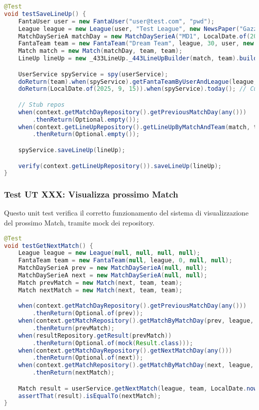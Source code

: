 \begin{lstlisting}[language=Java]
@Test
void testSaveLineUp() {
	FantaUser user = new FantaUser("user@test.com", "pwd");
	League league = new League(user, "Test League", new NewsPaper("Gazzetta"), "L003");
	MatchDaySerieA matchDay = new MatchDaySerieA("MD1", LocalDate.of(2025, 9, 15)); // Monday
	FantaTeam team = new FantaTeam("Dream Team", league, 30, user, new HashSet<>());
	Match match = new Match(matchDay, team, team);
	LineUp lineUp = new _433LineUp._443LineUpBuilder(match, team).build();

	UserService spyService = spy(userService);
	doReturn(team).when(spyService).getFantaTeamByUserAndLeague(league, user);
	doReturn(LocalDate.of(2025, 9, 15)).when(spyService).today(); // Current Monday

	// Stub repos
	when(context.getMatchDayRepository().getPreviousMatchDay(any()))
        .thenReturn(Optional.empty());
	when(context.getLineUpRepository().getLineUpByMatchAndTeam(match, team))
        .thenReturn(Optional.empty());

	spyService.saveLineUp(lineUp);

	verify(context.getLineUpRepository()).saveLineUp(lineUp);
}
\end{lstlisting}


\subsubsection{Test UT XXX: Visualizza prossimo Match}

Questo unit test verifica il corretto funzionamento del sistema di visualizzazione del prossimo Match,
tramite mock dei repository.

\begin{lstlisting}[language=Java]
@Test
void testGetNextMatch() {
    League league = new League(null, null, null, null);
	FantaTeam team = new FantaTeam(null, league, 0, null, null);
	MatchDaySerieA prev = new MatchDaySerieA(null, null);
	MatchDaySerieA next = new MatchDaySerieA(null, null);
	Match prevMatch = new Match(next, team, team);
	Match nextMatch = new Match(next, team, team);

	when(context.getMatchDayRepository().getPreviousMatchDay(any()))
        .thenReturn(Optional.of(prev));
	when(context.getMatchRepository().getMatchByMatchDay(prev, league, team))
        .thenReturn(prevMatch);
	when(resultRepository.getResult(prevMatch))
        .thenReturn(Optional.of(mock(Result.class)));
	when(context.getMatchDayRepository().getNextMatchDay(any()))
        .thenReturn(Optional.of(next));
	when(context.getMatchRepository().getMatchByMatchDay(next, league, team))
        .thenReturn(nextMatch);

	Match result = userService.getNextMatch(league, team, LocalDate.now());
	assertThat(result).isEqualTo(nextMatch);
}
\end{lstlisting}


